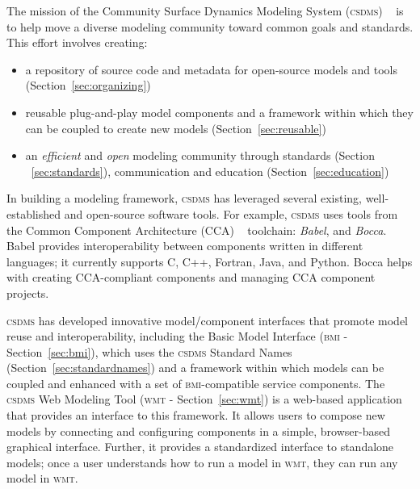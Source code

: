 \documentclass[11pt, oneside]{amsart}
\DeclareRobustCommand{\csdms}{\textsc{csdms}}
\DeclareRobustCommand{\bmi}{\textsc{bmi}}
\DeclareRobustCommand{\wmt}{\textsc{wmt}}
\begin{document}
The mission of the Community Surface Dynamics Modeling System (\csdms{})
~\cite{peckham2012component} is to help move a diverse modeling community toward
common goals and standards. This effort involves creating:
\begin{itemize}
  \item a repository of source code and metadata for open-source models and
    tools (Section~\ref{sec:organizing})
  \item reusable plug-and-play model components and a framework
        within which they can be coupled to create new models
        (Section~\ref{sec:reusable})
  \item an \emph{efficient} and \emph{open} modeling community through
        standards (Section ~\ref{sec:standards}),
        communication and education (Section~\ref{sec:education})
\end{itemize}

In building a modeling framework, \csdms{} has leveraged
several existing, well-established and open-source software tools. For example,
\csdms{} uses tools from the Common Component Architecture (CCA)
~\cite{armstrong1999toward} toolchain: \emph{Babel}, and \emph{Bocca}. Babel
provides interoperability between components
written in different languages; it currently supports C, C++, Fortran, Java,
and Python. Bocca helps with creating CCA-compliant components and managing CCA
component projects.

\csdms{} has developed innovative model/component interfaces that promote
model reuse and interoperability,
including the Basic Model Interface (\bmi{} - Section~\ref{sec:bmi}), which
uses
the \csdms{} Standard Names (Section~\ref{sec:standardnames}) and a framework
within which models can be coupled and enhanced with a set of \bmi{}-compatible
service components.
The \csdms{} Web Modeling Tool (\wmt{} - Section~\ref{sec:wmt}) is a
web-based application that provides an interface to this
framework.
It allows users to compose new models by connecting and
configuring components in a simple, browser-based graphical interface.
Further, it provides a standardized interface to standalone models;
once a user understands how to run a model in \wmt{},
they can run any model in \wmt{}.
\end{document}
